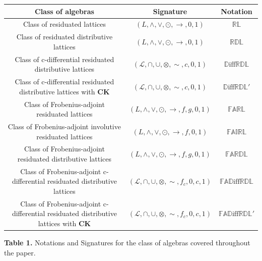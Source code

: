 \documentclass[final,12pt,times]{elsarticle}
\theoremstyle{plain}
\theoremstyle{definition}
\theoremstyle{break}
\begin{document}
\begin{table}[H]
\footnotesize
\begin{center}
\begin{tabular}{ccc}
\midrule %
\textbf{Class of algebras} &\textbf{Signature} &\textbf{Notation} \\
\midrule
Class of residuated lattices & $(L,\wedge,\vee,\odot,\rightarrow,0,1)$ & $\mathbb{RL}$ \\
Class of residuated distributive lattices & $(L,\wedge,\vee,\odot,\rightarrow,0,1)$ & $\mathbb {RDL}$ \\
Class of c-differential residuated distributive lattices & $(\mathcal{L},\cap,\cup,\otimes,{\sim},c,0,1)$ & $\mathbb{D}\text{iff}\mathbb{RDL}$\\
Class of  c-differential residuated distributive lattices with $\mathbf{CK}$  & $(\mathcal{L},\cap,\cup,\otimes,{\sim},c,0,1)$ & $\mathbb{D}\text{iff}\mathbb{RDL'}$\\
Class of Frobenius-adjoint residuated lattices & $(L,\wedge,\vee,\odot,\rightarrow,f,g,0,1)$ & $\mathbb{FARL}$ \\
Class  of Frobenius-adjoint involutive residuated lattices & $(L,\wedge,\vee,\odot,\rightarrow,f,0,1)$ &  $\mathbb{FAIRL}$ \\
Class of Frobenius-adjoint residuated distributive lattices & $(L,\wedge,\vee,\odot,\rightarrow,f,g,0,1)$ & $\mathbb{FARDL}$ \\
Class of Frobenius-adjoint c-differential residuated distributive lattices & $(\mathcal{L},\cap,\cup,\otimes,\sim,f_c,0,c,1)$ & $\mathbb{FA}\mathbb{D}\text{iff}\mathbb{RDL}$\\
Class of Frobenius-adjoint c-differential residuated distributive lattices with $\mathbf{CK}$  & $(\mathcal{L},\cap,\cup,\otimes,\sim, f_c,0,c,1)$ & $\mathbb{FA}\mathbb{D}\text{iff}\mathbb{RDL'}$\\
\bottomrule
\end{tabular}
\end{center}
\centering
{\bf{Table 1.}}  Notations and Signatures for the class of algebras covered throughout the paper.
\end{table}
\end{document}
